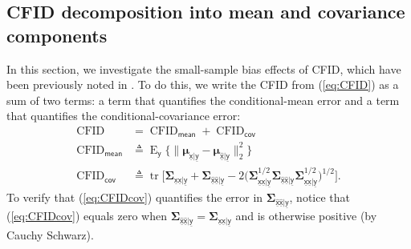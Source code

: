 \documentclass{article}
\theoremstyle{plain}
\theoremstyle{definition}
\theoremstyle{remark}
\renewcommand{\hat}{\widehat}
\newcommand{\defn}{\triangleq}
\renewcommand{\vec}[1]{\ensuremath{\boldsymbol{#1}}}
\DeclareMathOperator{\E}{E}
\DeclareMathOperator{\tr}{tr}
\renewcommand{\eqref}[1]{(\ref{eq:#1})}
\newcommand{\tabref}[1]{Table~\ref{tab:#1}}
\newcommand{\appref}[1]{Appendix~\ref{app:#1}}
\newcommand{\Ey}{\E_{\mathsf{y}}}
\DeclareMathOperator{\CFID}{CFID}
\newcommand{\muxugyu}{\vec{\mu}_{\underline{\mathsf{x}}|\underline{\mathsf{y}}}}
\newcommand{\muxhugyu}{\vec{\mu}_{\underline{\hat{\mathsf{x}}}|\underline{\mathsf{y}}}}
\newcommand{\Sigxugyu}{\vec{\Sigma}_{\underline{\mathsf{x}}\underline{\mathsf{x}}|\underline{\mathsf{y}}}}
\newcommand{\Sigxuhgyu}{\vec{\Sigma}_{\underline{\hat{\mathsf{x}}}\underline{\hat{\mathsf{x}}}|\underline{\mathsf{y}}}}
\newcommand{\mean}{_{\mathsf{mean}}}
\newcommand{\cova}{_{\mathsf{cov}}}
\begin{document}

\subsection{CFID decomposition into mean and covariance components} \label{app:CFID}
In this section, we investigate the small-sample bias effects of CFID, which have been previously noted in \cite{Soloveitchik:21}.
To do this, we write the CFID from \eqref{CFID} as a sum of two terms: a term that quantifies the conditional-mean error and a term that quantifies the conditional-covariance error:
\begin{align}
\CFID 
&= \CFID\mean + \CFID\cova \\
\CFID\mean
&\defn \Ey\{ \|\muxugyu-\muxhugyu\|_2^2 \} \\
\CFID\cova
&\defn  \tr\big[ \Sigxugyu + \Sigxuhgyu 
- 2 \big( \Sigxugyu^{1/2} \Sigxuhgyu \Sigxugyu^{1/2} \big)^{1/2} \big]
\label{eq:CFIDcov}.
\end{align}
To verify that \eqref{CFIDcov} quantifies the error in $\Sigxuhgyu$, notice that \eqref{CFIDcov} equals zero when $\Sigxuhgyu=\Sigxugyu$ and is otherwise positive (by Cauchy Schwarz).
\end{document}

